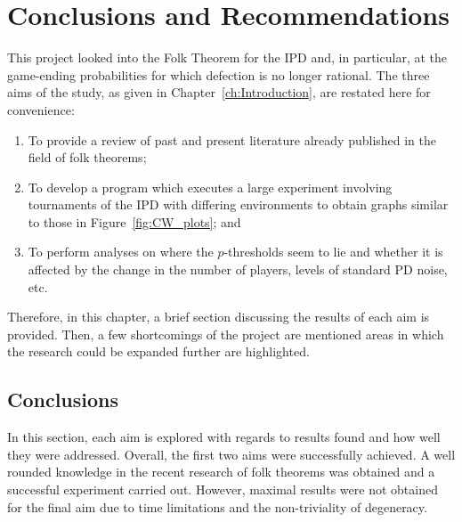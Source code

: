 \chapter{Conclusions and Recommendations}\label{ch:Conclusions}
This project looked into the Folk Theorem for the IPD and, in particular, at the
game-ending probabilities for which defection is no longer rational. The three
aims of the study, as given in Chapter~\ref{ch:Introduction}, are restated here for
convenience:

\begin{enumerate}
    \item To provide a review of past and present literature already published in
    the field of folk theorems;
    
    \item To develop a program which executes a large experiment involving
    tournaments of the IPD with differing environments to obtain
    graphs similar to those in Figure~\ref{fig:CW_plots}; and
    
    \item To perform analyses on where the \(p\)-thresholds seem to lie and
    whether it is affected by the change in the number of players, levels of
    standard PD noise, etc.
\end{enumerate}

Therefore, in this chapter, a brief section discussing the results of each aim
is provided. Then, a few shortcomings of the project are mentioned areas in
which the research could be expanded further are highlighted.

\section{Conclusions}\label{sec:Conclusions}
In this section, each aim is explored with regards to results found and how well they were addressed. Overall, the first two aims were
successfully achieved. A well rounded knowledge in the recent research of
folk theorems was obtained and a successful experiment carried out. However,
maximal results were not obtained for the final aim due to time limitations and
the non-triviality of degeneracy.


